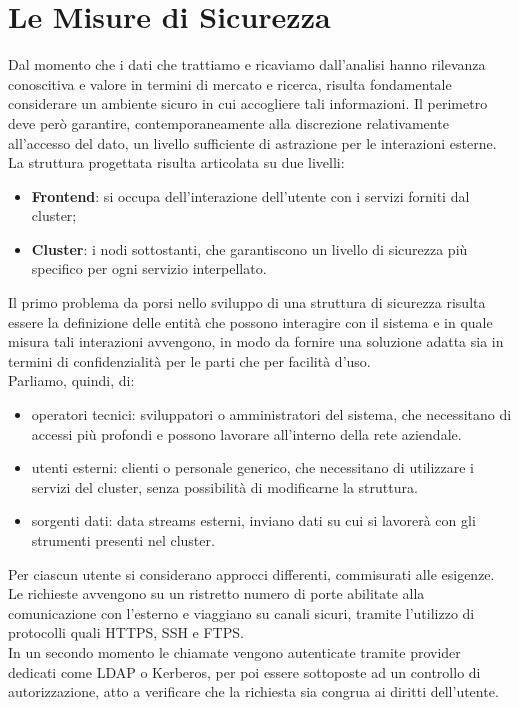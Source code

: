 \chapter{Le Misure di Sicurezza}

Dal momento che i dati che trattiamo e ricaviamo dall'analisi hanno rilevanza conoscitiva e valore in termini di mercato e ricerca, risulta fondamentale considerare un ambiente sicuro in cui accogliere tali informazioni. Il perimetro deve però garantire, contemporaneamente alla discrezione relativamente all'accesso del dato, un livello sufficiente di astrazione per le interazioni esterne.\\
La struttura progettata risulta articolata su due livelli:
\begin{itemize}
	\item \textbf{Frontend}: si occupa dell'interazione dell'utente con i servizi forniti dal cluster;
	\item \textbf{Cluster}: i nodi sottostanti, che garantiscono un livello di sicurezza più specifico per ogni servizio interpellato.
\end{itemize}
Il primo problema da porsi nello sviluppo di una struttura di sicurezza risulta essere la definizione delle entità che possono interagire con il sistema e in quale misura tali interazioni avvengono, in modo da fornire una soluzione adatta sia in termini di confidenzialità per le parti che per facilità d'uso.\\
Parliamo, quindi, di:
\begin{itemize}
	\item operatori tecnici: sviluppatori o amministratori del sistema, che necessitano di accessi più profondi e possono lavorare all'interno della rete aziendale.
	\item utenti esterni: clienti o personale generico, che necessitano di utilizzare i servizi del cluster, senza possibilità di modificarne la struttura.
	\item sorgenti dati: data streams esterni, inviano dati su cui si lavorerà con gli strumenti presenti nel cluster.
\end{itemize}
Per ciascun utente si considerano approcci differenti, commisurati alle esigenze. Le richieste avvengono su un ristretto numero di porte abilitate alla comunicazione con l'esterno e viaggiano su canali sicuri, tramite l'utilizzo di protocolli quali HTTPS, SSH e FTPS.\\
In un secondo momento le chiamate vengono autenticate tramite provider dedicati come LDAP o Kerberos, per poi essere sottoposte ad un controllo di autorizzazione, atto a verificare che la richiesta sia congrua ai diritti dell'utente.\\
